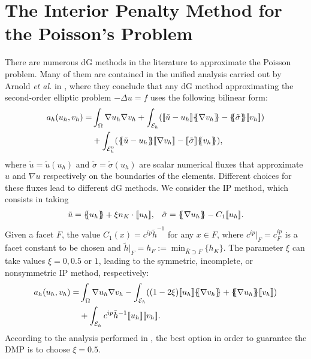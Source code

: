 \section{The Interior Penalty Method for the Poisson's Problem}\label{s-ip} There are numerous dG methods in the literature to approximate the Poisson problem. Many of them are contained in the unified analysis carried out by Arnold \emph{et al.} in \cite{arnold_unified_2002}, where they conclude that any dG method approximating the second-order elliptic problem $-\Delta u = f$ uses the following bilinear form:
\begin{align*}
a_h(u_h,v_h) = & \int_\Omega  \nabla u_{h} \nabla v_{h} + \int_{\mathcal{E}_h} (\jump{\tilde{u}-u_h}\mean{ \nabla v_{h}} - \mean{\tilde{\sigma}} \jump{v_h})\\
& + \int_{\mathcal{E}_h^0} (\mean{\tilde{u}-u_h}\jump{ \nabla v_{h}} - \jump{\tilde{\sigma}} \mean{v_h}),
\end{align*}
where $\tilde{u}=\tilde{u}(u_h)$ and $\tilde{\sigma}=\tilde{\sigma}(u_h)$ are  scalar numerical fluxes that approximate $u$ and $\nabla u$ respectively on the boundaries of the elements. Different choices for these fluxes lead to different dG methods. We consider the IP method, which consists in taking 
\begin{align*}
\tilde{u} = \mean{u_h} + \xi n_K\cdot\jump{u_h}, & &  \tilde{\sigma} = \mean{\nabla u_{h}} - C_1 \jump{u_h}.
\end{align*}
Given a facet $F$, the value $C_1(x)=c^{ip} \tilde{h}^{-1}$ for any $x \in F$, where $c^{ip}|_F=c^{ip}_F$ is a facet constant to be chosen and $\tilde{h}|_F = h_F := \min_{\bar{K} \supset F}\{h_K\}$. The parameter $\xi$ can take values $\xi=0,0.5$ or $1$, leading to the symmetric, incomplete, or nonsymmetric IP method, respectively:
\begin{align}\label{eq-muIP}
\begin{split}
a_h(u_h,v_h) = &\int_\Omega  \nabla u_{h} \nabla v_{h} - \int_{\mathcal{E}_h} ((1-2\xi)\jump{u_h}\mean{ \nabla v_{h}} + \mean{\nabla u_h} \jump{v_h}) \\
& +  \int_{\mathcal{E}_h}c^{ip} \tilde{h}^{-1} \jump{  u_{h}}\jump{  v_{h}}.
\end{split}
\end{align}
 According to the analysis performed in \cite{horvath_discrete_2013}, the best option in order to guarantee the DMP is to choose $\xi = 0.5$. %
 
